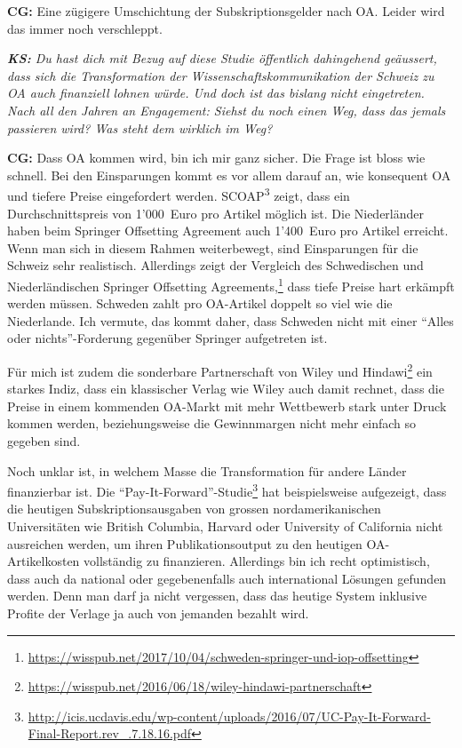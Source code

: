 \documentclass[a4paper,
fontsize=11pt,
oneside,
numbers=noperiodatend,
parskip=half-,
bibliography=totoc,
final
]{scrartcl}
\begin{document}
\textbf{CG:} Eine zügigere Umschichtung der Subskriptionsgelder nach OA.
Leider wird das immer noch verschleppt.

\emph{\textbf{KS:} Du hast dich mit Bezug auf diese Studie öffentlich
dahingehend geäussert, dass sich die Transformation der
Wissenschaftskommunikation der Schweiz zu OA auch finanziell lohnen
würde. Und doch ist das bislang nicht eingetreten. Nach all den Jahren
an Engagement: Siehst du noch einen Weg, dass das jemals passieren wird?
Was steht dem wirklich im Weg?}

\textbf{CG:} Dass OA kommen wird, bin ich mir ganz sicher. Die Frage ist
bloss wie schnell. Bei den Einsparungen kommt es vor allem darauf an,
wie konsequent OA und tiefere Preise eingefordert werden.
SCOAP\textsuperscript{3} zeigt, dass ein Durchschnittspreis von
1'000~Euro pro Artikel möglich ist. Die Niederländer haben beim Springer
Offsetting Agreement auch 1'400~Euro pro Artikel erreicht. Wenn man sich
in diesem Rahmen weiterbewegt, sind Einsparungen für die Schweiz sehr
realistisch. Allerdings zeigt der Vergleich des Schwedischen und
Niederländischen Springer Offsetting Agreements,\footnote{\url{https://wisspub.net/2017/10/04/schweden-springer-und-iop-offsetting}}
dass tiefe Preise hart erkämpft werden müssen. Schweden zahlt pro
OA-Artikel doppelt so viel wie die Niederlande. Ich vermute, das kommt
daher, dass Schweden nicht mit einer \enquote{Alles oder
nichts}-Forderung gegenüber Springer aufgetreten ist.

Für mich ist zudem die sonderbare Partnerschaft von Wiley und
Hindawi\footnote{\url{https://wisspub.net/2016/06/18/wiley-hindawi-partnerschaft}}
ein starkes Indiz, dass ein klassischer Verlag wie Wiley auch damit
rechnet, dass die Preise in einem kommenden OA-Markt mit mehr Wettbewerb
stark unter Druck kommen werden, beziehungsweise die Gewinnmargen nicht
mehr einfach so gegeben sind.

Noch unklar ist, in welchem Masse die Transformation für andere Länder
finanzierbar ist. Die \enquote{Pay-It-Forward}-Studie\footnote{\url{http://icis.ucdavis.edu/wp-content/uploads/2016/07/UC-Pay-It-Forward-Final-Report.rev_.7.18.16.pdf}}
hat beispielsweise aufgezeigt, dass die heutigen Subskriptionsausgaben
von grossen nordamerikanischen Universitäten wie British Columbia,
Harvard oder University of California nicht ausreichen werden, um ihren
Publikationsoutput zu den heutigen OA-Artikelkosten vollständig zu
finanzieren. Allerdings bin ich recht optimistisch, dass auch da
national oder gegebenenfalls auch international Lösungen gefunden
werden. Denn man darf ja nicht vergessen, dass das heutige System
inklusive Profite der Verlage ja auch von jemanden bezahlt wird.
\end{document}

